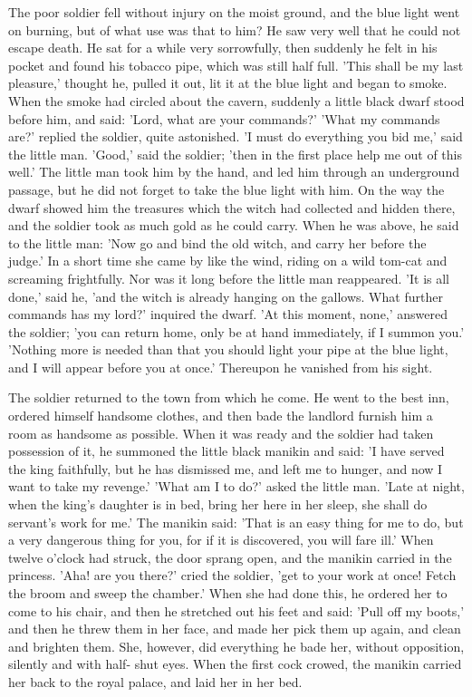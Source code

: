 \documentclass[12pt]{book}
\begin{document}
The poor soldier fell without injury on the moist ground, and the blue
light went on burning, but of what use was that to him? He saw very
well that he could not escape death. He sat for a while very
sorrowfully, then suddenly he felt in his pocket and found his tobacco
pipe, which was still half full. 'This shall be my last pleasure,'
thought he, pulled it out, lit it at the blue light and began to
smoke. When the smoke had circled about the cavern, suddenly a little
black dwarf stood before him, and said: 'Lord, what are your
commands?' 'What my commands are?' replied the soldier, quite
astonished. 'I must do everything you bid me,' said the little man.
'Good,' said the soldier; 'then in the first place help me out of this
well.' The little man took him by the hand, and led him through an
underground passage, but he did not forget to take the blue light with
him. On the way the dwarf showed him the treasures which the witch had
collected and hidden there, and the soldier took as much gold as he
could carry. When he was above, he said to the little man: 'Now go and
bind the old witch, and carry her before the judge.' In a short time
she came by like the wind, riding on a wild tom-cat and screaming
frightfully. Nor was it long before the little man reappeared. 'It is
all done,' said he, 'and the witch is already hanging on the gallows.
What further commands has my lord?' inquired the dwarf. 'At this
moment, none,' answered the soldier; 'you can return home, only be at
hand immediately, if I summon you.' 'Nothing more is needed than that
you should light your pipe at the blue light, and I will appear before
you at once.' Thereupon he vanished from his sight.

The soldier returned to the town from which he come. He went to the
best inn, ordered himself handsome clothes, and then bade the landlord
furnish him a room as handsome as possible. When it was ready and the
soldier had taken possession of it, he summoned the little black
manikin and said: 'I have served the king faithfully, but he has
dismissed me, and left me to hunger, and now I want to take my
revenge.' 'What am I to do?' asked the little man. 'Late at night,
when the king's daughter is in bed, bring her here in her sleep, she
shall do servant's work for me.' The manikin said: 'That is an easy
thing for me to do, but a very dangerous thing for you, for if it is
discovered, you will fare ill.' When twelve o'clock had struck, the
door sprang open, and the manikin carried in the princess. 'Aha! are
you there?' cried the soldier, 'get to your work at once! Fetch the
broom and sweep the chamber.' When she had done this, he ordered her
to come to his chair, and then he stretched out his feet and said:
'Pull off my boots,' and then he threw them in her face, and made her
pick them up again, and clean and brighten them. She, however, did
everything he bade her, without opposition, silently and with half-
shut eyes. When the first cock crowed, the manikin carried her back to
the royal palace, and laid her in her bed.
\end{document}

